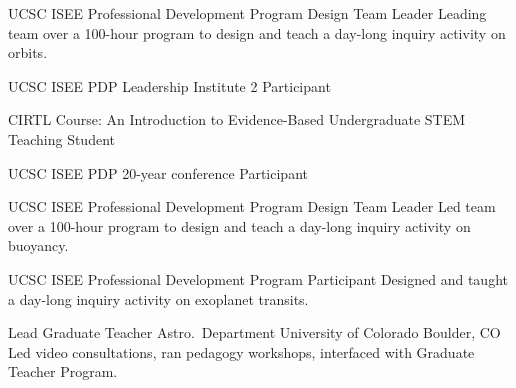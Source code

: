 		{UCSC ISEE Professional Development Program}
		{Design Team Leader}
		{}
		{}
		{Leading team over a 100-hour program to design and teach a day-long inquiry activity on orbits.}



        {UCSC ISEE PDP Leadership Institute 2}
        {Participant}
        {}{}{}

        {CIRTL Course: An Introduction to Evidence-Based Undergraduate STEM Teaching}
        {Student}
        {}{}{}

\cventry{}
        {UCSC ISEE PDP 20-year conference}
        {Participant}
        {}{}{}

		{UCSC ISEE Professional Development Program}
		{Design Team Leader}
		{}
		{}
		{Led team over a 100-hour program to design and teach a day-long inquiry activity on buoyancy.}

		{UCSC ISEE Professional Development Program}
		{Participant}
		{}
		{}
		{Designed and taught a day-long inquiry activity on exoplanet transits.}

		{Lead Graduate Teacher}
		{Astro.~Department}
		{University of Colorado}
		{Boulder, CO}
		{Led video consultations, ran pedagogy workshops, interfaced with Graduate Teacher Program.}


